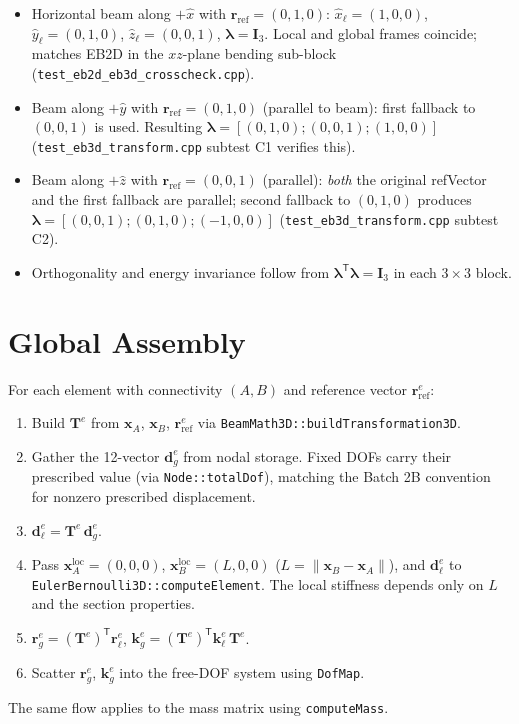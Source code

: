 \documentclass[11pt,a4paper]{article}
\newcommand{\bmath}[1]{\boldsymbol{#1}}
\begin{document}
\begin{itemize}
    \item Horizontal beam along $+\hat{x}$ with $\bmath{r}_{\text{ref}} = (0,1,0)$: $\hat{x}_\ell = (1,0,0)$, $\hat{y}_\ell = (0,1,0)$, $\hat{z}_\ell = (0,0,1)$, $\bmath{\lambda} = \bmath{I}_3$. Local and global frames coincide; matches EB2D in the $xz$-plane bending sub-block (\texttt{test\_eb2d\_eb3d\_crosscheck.cpp}).
    \item Beam along $+\hat{y}$ with $\bmath{r}_{\text{ref}} = (0,1,0)$ (parallel to beam): first fallback to $(0,0,1)$ is used. Resulting $\bmath{\lambda} = [(0,1,0); (0,0,1); (1,0,0)]$ (\texttt{test\_eb3d\_transform.cpp} subtest C1 verifies this).
    \item Beam along $+\hat{z}$ with $\bmath{r}_{\text{ref}} = (0,0,1)$ (parallel): \emph{both} the original refVector and the first fallback are parallel; second fallback to $(0,1,0)$ produces $\bmath{\lambda} = [(0,0,1); (0,1,0); (-1,0,0)]$ (\texttt{test\_eb3d\_transform.cpp} subtest C2).
    \item Orthogonality and energy invariance follow from $\bmath{\lambda}^\mathsf{T}\bmath{\lambda} = \bmath{I}_3$ in each $3\times 3$ block.
\end{itemize}

\section{Global Assembly}

For each element with connectivity $(A, B)$ and reference vector $\bmath{r}_{\text{ref}}^e$:
\begin{enumerate}
    \item Build $\bmath{T}^e$ from $\bmath{x}_A$, $\bmath{x}_B$, $\bmath{r}_{\text{ref}}^e$ via \texttt{BeamMath3D::buildTransformation3D}.
    \item Gather the 12-vector $\bmath{d}_g^e$ from nodal storage. Fixed DOFs carry their prescribed value (via \texttt{Node::totalDof}), matching the Batch 2B convention for nonzero prescribed displacement.
    \item $\bmath{d}_\ell^e = \bmath{T}^e\,\bmath{d}_g^e$.
    \item Pass $\bmath{x}_A^{\text{loc}} = (0,0,0)$, $\bmath{x}_B^{\text{loc}} = (L,0,0)$ ($L = \|\bmath{x}_B - \bmath{x}_A\|$), and $\bmath{d}_\ell^e$ to \texttt{EulerBernoulli3D::computeElement}. The local stiffness depends only on $L$ and the section properties.
    \item $\bmath{r}_g^e = (\bmath{T}^e)^\mathsf{T}\bmath{r}_\ell^e$, $\bmath{k}_g^e = (\bmath{T}^e)^\mathsf{T}\bmath{k}_\ell^e\,\bmath{T}^e$.
    \item Scatter $\bmath{r}_g^e$, $\bmath{k}_g^e$ into the free-DOF system using \texttt{DofMap}.
\end{enumerate}
The same flow applies to the mass matrix using \texttt{computeMass}.
\end{document}
